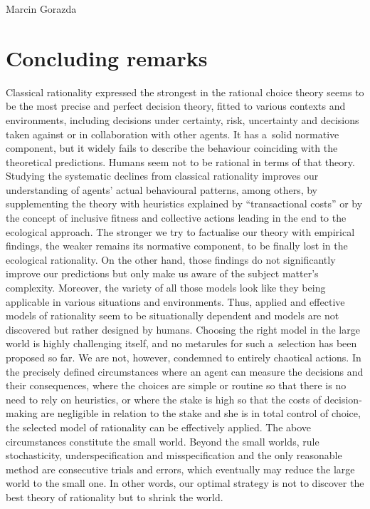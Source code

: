 \begin{artengenv}{Marcin Gorazda}
\section*{Concluding remarks}
Classical rationality expressed the strongest in the rational choice theory seems to be the most precise and perfect decision theory, fitted to various contexts and environments, including decisions under certainty, risk, uncertainty and decisions taken against or in collaboration with other agents. It has a~solid normative component, but it widely fails to describe the behaviour coinciding with the theoretical predictions. Humans seem not to be rational in terms of that theory. Studying the systematic declines from classical rationality improves our understanding of agents' actual behavioural patterns, among others, by supplementing the theory with heuristics explained by ``transactional costs'' or by the concept of inclusive fitness and collective actions leading in the end to the ecological approach. The stronger we try to factualise our theory with empirical findings, the weaker remains its normative component, to be finally lost in the ecological rationality. On the other hand, those findings do not significantly improve our predictions but only make us aware of the subject matter's complexity. Moreover, the variety of all those models look like they being applicable in various situations and environments. Thus, applied and effective models of rationality seem to be situationally dependent and models are not discovered but rather designed by humans. Choosing the right model in the large world is highly challenging itself, and no metarules for such a~selection has been proposed so far. We are not, however, condemned to entirely chaotical actions. In the precisely defined circumstances where an agent can measure the decisions and their consequences, where the choices are simple or routine so that there is no need to rely on heuristics, or where the stake is high so that the costs of decision-making are negligible in relation to the stake and she is in total control of choice, the selected model of rationality can be effectively applied. The above circumstances constitute the small world. Beyond the small worlds, rule stochasticity, underspecification and misspecification and the only reasonable method are consecutive trials and errors, which eventually may reduce the large world to the small one. In other words, our optimal strategy is not to discover the best theory of rationality but to shrink the world.

\end{artengenv}